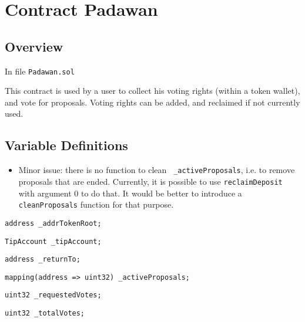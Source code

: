 
\chapter{Contract Padawan}

\minitoc

\section{Overview}

In file {\tt Padawan.sol}

This contract is used by a user to collect his voting rights (within a
token wallet), and vote for proposals. Voting rights can be added, and
reclaimed if not currently used.

\section{Variable Definitions}

\begin{itemize}
\item Minor issue: there is no function to clean {\tt
  \_activeProposals}, i.e. to remove proposals that are
  ended. Currently, it is possible to use {\tt reclaimDeposit} with
  argument 0 to do that. It would be better to introduce a {\tt
    cleanProposals} function for that purpose.
\end{itemize}

\begin{lstlisting}[firstnumber=21]
    address _addrTokenRoot;
\end{lstlisting}

\begin{lstlisting}[firstnumber=23]
    TipAccount _tipAccount;
\end{lstlisting}

\begin{lstlisting}[firstnumber=24]
    address _returnTo;
\end{lstlisting}

\begin{lstlisting}[firstnumber=26]
    mapping(address => uint32) _activeProposals;
\end{lstlisting}

\begin{lstlisting}[firstnumber=28]
    uint32 _requestedVotes;
\end{lstlisting}

\begin{lstlisting}[firstnumber=29]
    uint32 _totalVotes;
\end{lstlisting}

